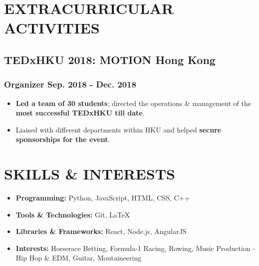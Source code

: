 \documentclass{article}
\begin{document}
\vspace{-6.9mm}
\section{EXTRACURRICULAR ACTIVITIES}
\vspace{-1.5mm}

\subsection{TEDxHKU 2018: MOTION \hspace{4.2in} Hong Kong}
\subsubsection{Organizer \hspace{5.5in} Sep. 2018 - Dec. 2018}
\vspace{-2.9mm}
\begin{itemize}[noitemsep]
\item \textbf{Led a team of 30 students}; directed the operations \& management of the \textbf{most successful TEDxHKU till date}.
\item Liaised with different departments within HKU and helped \textbf{secure sponsorships for the event}.
\end{itemize}


\section{SKILLS \& INTERESTS}
\vspace{-2mm}
\begin{itemize}[noitemsep]
\item \textbf{Programming:} Python, JavaScript, HTML, CSS, C++
\item \textbf{Tools \& Technologies:} Git, {\LaTeX}
\item \textbf{Libraries \& Frameworks:} React, Node.js, AngularJS
\item \textbf{Interests:} Horserace Betting, Formula-1 Racing, Rowing, Music Production - Hip Hop \& EDM, Guitar, Moutaineering
\end{itemize}
\end{document}

